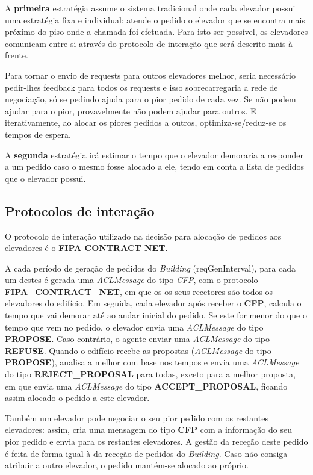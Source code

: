 \documentclass[a4paper]{article}
\begin{document}
A \textbf{primeira} estratégia assume o sistema tradicional onde cada elevador possui uma estratégia fixa e individual: atende o pedido o elevador que se encontra mais próximo do piso onde a chamada foi efetuada. Para isto ser possível, os elevadores comunicam entre si através do protocolo de interação que será descrito mais à frente. 

Para tornar o envio de requests para outros elevadores melhor, seria necessário pedir-lhes feedback para todos os requests e isso sobrecarregaria a rede de negociação, só se pedindo ajuda para o pior pedido de cada vez. Se não podem ajudar para o pior, provavelmente não podem ajudar para outros. E iterativamente, ao alocar os piores pedidos a outros, optimiza-se/reduz-se os tempos de espera.

A \textbf{segunda} estratégia irá estimar o tempo que o elevador demoraria a responder a um pedido caso o mesmo fosse alocado a ele, tendo em conta a lista de pedidos que o elevador possui.

\subsection{Protocolos de interação} 

O protocolo de interação utilizado na decisão para alocação de pedidos aos elevadores é o \textbf{FIPA CONTRACT NET}.

A cada período de geração de pedidos do \textit{Building} (reqGenInterval), para cada um destes é gerada uma \textit{ACLMessage} do tipo \textit{CFP}, com o protocolo \textbf{FIPA\_CONTRACT\_NET}, em que os os seus recetores são todos os elevadores do edifício. Em seguida, cada elevador após receber o \textbf{CFP}, calcula o tempo que vai demorar até ao andar inicial do pedido. Se este for menor do que o tempo que vem no pedido, o elevador envia uma \textit{ACLMessage} do tipo \textbf{PROPOSE}. Caso contrário, o agente enviar uma \textit{ACLMessage} do tipo \textbf{REFUSE}. Quando o edifício recebe as propostas (\textit{ACLMessage} do tipo \textbf{PROPOSE}), analisa a melhor com base nos tempos e envia uma \textit{ACLMessage} do tipo \textbf{REJECT\_PROPOSAL} para todas, exceto para a melhor proposta, em que envia uma \textit{ACLMessage} do tipo \textbf{ACCEPT\_PROPOSAL}, ficando assim alocado o pedido a este elevador.

Também um elevador pode negociar o seu pior pedido com os restantes elevadores: assim, cria uma mensagem do tipo \textbf{CFP} com a informação do seu pior pedido e envia para os restantes elevadores. A gestão da receção deste pedido é feita de forma igual à da receção de pedidos do \textit{Building}. Caso não consiga atribuir a outro elevador, o pedido mantém-se alocado ao próprio. 
\end{document}

